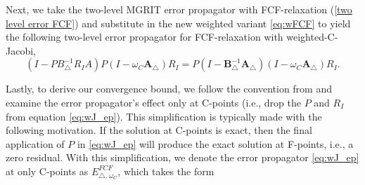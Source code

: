 \documentclass[VANCOUVER,STIX1COL]{WileyNJD-v2}
\makeatletter
\newcommand{\bs}[1]{\textcolor{magenta}{[BS\@: #1]}}
\newcommand{\JS}[1]{\textcolor{blue}{[JS\@: #1]}}
\makeatother
\begin{document}


Next, we take the two-level MGRIT error propagator with FCF-relaxation (\ref{two level error FCF}) and 
substitute in the new weighted variant \eqref{eq:wFCF} to yield the following
two-level error propagator for FCF-relaxation with weighted-C-Jacobi,
\begin{equation} \label{eq:wJ_ep}
(I-PB^{-1}_{\triangle}R_IA)P(I - \omega_C \mathbf{A}_{\triangle})R_I = P(I-\mathbf{B}_{\triangle}^{-1}\mathbf{A}_{\triangle})(I - \omega_C \mathbf{A}_{\triangle})R_I .
\end{equation}

Lastly, to derive our convergence bound, we follow the convention from \cite{Do2016, HeSoNoRoFaSc2018}
and examine the error propagator's effect only at C-points (i.e., drop the $P$ and $R_I$ from equation \eqref{eq:wJ_ep}).  This simplification is typically made with the 
following motivation.  If the solution at C-points is exact, then the final application of $P$ in 
\eqref{eq:wJ_ep} will produce the exact solution at F-points, i.e., a zero residual.  With this 
simplification, we denote the error propagator \eqref{eq:wJ_ep} at only C-points as $E_{\triangle, \hspace{1pt} \omega_C}^{FCF}$, which takes the form
\end{document}
